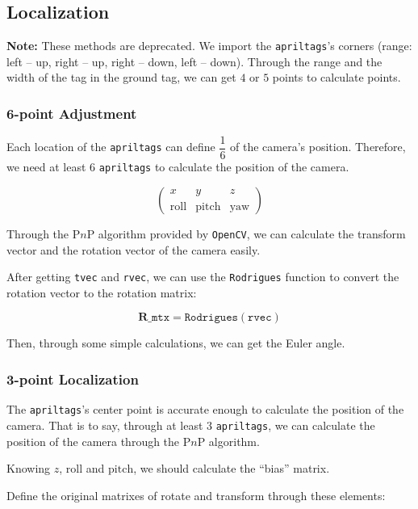 \documentclass{article}
\begin{document}
\subsection{Localization}

\begin{mdframed}
  \textbf{Note:} These methods are deprecated. We import the \texttt{apriltags}'s corners (range: left -- up, right -- up, right -- down, left -- down). Through the range and the width of the tag in the ground tag, we can get $4$ or $5$ points to calculate points.
\end{mdframed}

\subsubsection{6-point Adjustment}
Each location of the \texttt{apriltags} can define $\dfrac16$ of the camera's position. Therefore, we need at least $6$ \texttt{apriltags} to calculate the position of the camera.

\[
  \left(
    \begin{matrix}
      x&y&z\\
      \mathrm{roll}&\mathrm{pitch}&\mathrm{yaw}
    \end{matrix}
  \right)
\]

Through the P$n$P algorithm provided by \texttt{OpenCV}, we can calculate the transform vector and the rotation vector of the camera easily.

After getting \texttt{tvec} and \texttt{rvec}, we can use the \texttt{Rodrigues} function to convert the rotation vector to the rotation matrix:

\[
  \boldsymbol{R}\_\texttt{mtx}=\texttt{Rodrigues}\left(\texttt{rvec}\right)
\]

Then, through some simple calculations, we can get the Euler angle.

\subsubsection{3-point Localization}
The \texttt{apriltags}'s center point is accurate enough to calculate the position of the camera. That is to say, through at least $3$ \texttt{apriltags}, we can calculate the position of the camera through the P$n$P algorithm.

Knowing $z$, $\mathrm{roll}$ and $\mathrm{pitch}$, we should calculate the ``bias'' matrix.

Define the original matrixes of rotate and transform through these elements:
\end{document}
